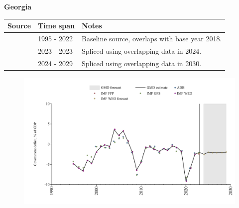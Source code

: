 \documentclass[12pt,a4paper,landscape]{article}
\begin{document}
\begin{adjustbox}{max totalsize={\paperwidth}{\paperheight},center}
\begin{minipage}[t][\textheight][t]{\textwidth}
\vspace*{0.5cm}
{}
\begin{center}
{\Large\bfseries Georgia}
\end{center}
\vspace{0.5cm}
\begin{table}[H]
\centering
\small
\begin{tabular}{|l|l|l|}
\hline
\textbf{Source} & \textbf{Time span} & \textbf{Notes} \\
\hline
\rowcolor{white}\cite{IMF_WEO}& 1995 - 2022 &Baseline source, overlaps with base year 2018.\\
\rowcolor{lightgray}\cite{IMF_GFS}& 2023 - 2023 &Spliced using overlapping data in 2024.\\
\rowcolor{white}\cite{IMF_WEO_forecast}& 2024 - 2029 &Spliced using overlapping data in 2030.\\
\hline
\end{tabular}
\end{table}
\begin{figure}[H]
\centering
\includegraphics[width=\textwidth,height=0.6\textheight,keepaspectratio]{graphs/GEO_govdef_GDP.pdf}
\end{figure}
\end{minipage}
\end{adjustbox}
\end{document}
